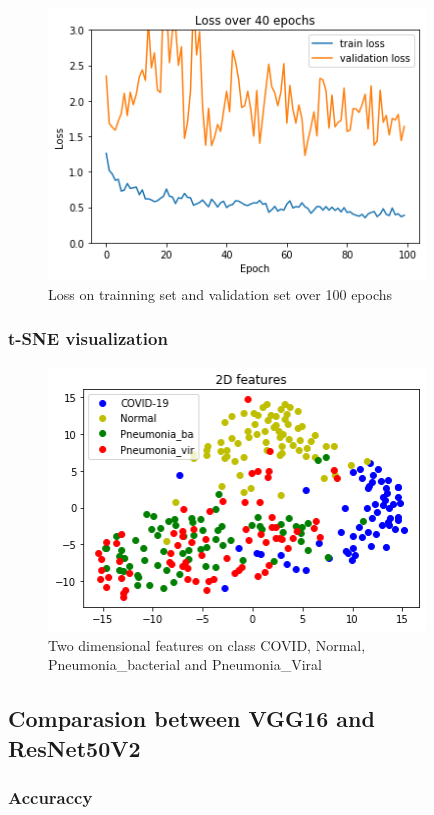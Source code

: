 \documentclass[a4paper,12pt]{article}
\begin{document}
\begin{figure}[H]
  \centering
  \includegraphics[width=10cm]{./images/ResNet50V2-loss.png}
     \caption{Loss on trainning set and validation set over 100 epochs}
        \label{task2-loss}
\end{figure}

\subsubsection{t-SNE visualization}
\begin{figure}[H]
  \centering
  \includegraphics[width=10cm]{./images/ResNet50V2-tsen.png}
     \caption{Two dimensional features on class COVID, Normal, Pneumonia\_bacterial and Pneumonia\_Viral}
        \label{task2-tsen}
\end{figure}

\subsection{Comparasion between VGG16 and ResNet50V2}
\subsubsection{Accuraccy}
\end{document}
